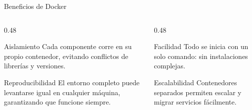 \begin{frame}{Beneficios de Docker}
    \begin{columns}[T,onlytextwidth]
        \begin{column}{0.48\textwidth}
            \begin{block}{Aislamiento}
                Cada componente corre en su propio contenedor, evitando conflictos de librerías y versiones.
            \end{block}

            \begin{block}{Reproducibilidad}
                El entorno completo puede levantarse igual en cualquier máquina, garantizando que funcione siempre.
            \end{block}
        \end{column}

        \begin{column}{0.48\textwidth}
            \begin{block}{Facilidad}
                Todo se inicia con un solo comando: sin instalaciones complejas.
            \end{block}

            \begin{block}{Escalabilidad}
                Contenedores separados permiten escalar y migrar servicios fácilmente.
            \end{block}
        \end{column}
    \end{columns}
\end{frame}

